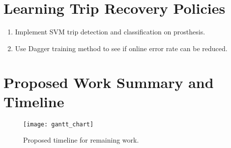 \section{Learning Trip Recovery Policies}\label{sec:proposed_trip_class}
\begin{enumerate}
    \item Implement SVM trip detection and classification on prosthesis.
    \item Use Dagger training method to see if online error rate can be reduced.
\end{enumerate}

\section{Proposed Work Summary and Timeline}\label{sec:proposed_summary}
\begin{figure*}[t]
    \centering
    \texttt{[image: gantt\_chart]}
    \caption{Proposed timeline for remaining work.}\label{fig:prosthesis_result}
\end{figure*}
